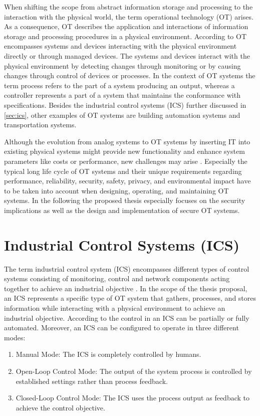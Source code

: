 When shifting the scope from abstract information storage and processing to the interaction with the physical world, the term operational technology (OT) arises.
As a consequence, OT describes the application and interactions of information storage and processing procedures in a physical environment.
According to \citeauthor{Stouffer2023} \cite{Stouffer2023} OT encompasses systems and devices interacting with the physical environment directly or through managed devices.
The systems and devices interact with the physical environment by detecting changes through monitoring or by causing changes through control of devices or processes.
In the context of OT systems the term process refers to the part of a system producing an output, whereas a controller represents a part of a system that maintains the conformance with specifications.
Besides the industrial control systems (ICS) further discussed in \autoref{sec:ics}, other examples of OT systems are building automation systems and transportation systems.

Although the evolution from analog systems to OT systems by inserting IT into existing physical systems might provide new functionality and enhance system parameters like costs or performance, new challenges may arise \cite{Stouffer2023}.
Especially the typical long life cycle of OT systems and their unique requirements regarding performance, reliability, security, safety, privacy, and environmental impact have to be taken into account when designing, operating, and maintaining OT systems.
In the following the proposed thesis especially focuses on the security implications as well as the design and implementation of secure OT systems.

\section{Industrial Control Systems (ICS)}
\label{sec:ics}
The term industrial control system (ICS) encompasses different types of control systems consisting of monitoring, control and network components acting together to achieve an industrial objective \cite{Stouffer2015}.
In the scope of the thesis proposal, an ICS represents a specific type of OT system that gathers, processes, and stores information while interacting with a physical environment to achieve an industrial objective.
According to \citeauthor{Stouffer2015} \cite{Stouffer2015} the control in an ICS can be partially or fully automated.
Moreover, an ICS can be configured to operate in three different modes:
\begin{enumerate}
    \item Manual Mode: The ICS is completely controlled by humans.
    \item Open-Loop Control Mode: The output of the system process is controlled by established settings rather than process feedback.
    \item Closed-Loop Control Mode: The ICS uses the process output as feedback to achieve the control objective.
\end{enumerate}

